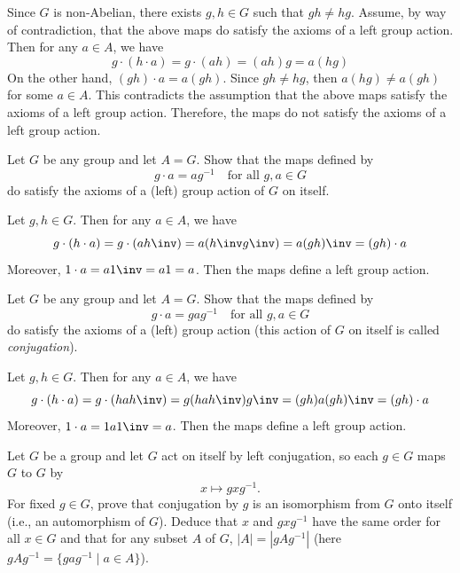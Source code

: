 \begin{sol}
    Since $G$ is non-Abelian, there exists $g, h \in G$ such that $gh \neq hg$. Assume, by way of contradiction, that the above maps do satisfy the axioms of a left group action. Then for any $a \in A$, we have
    \[g \cdot (h \cdot a) = g \cdot (ah) = (ah)g = a(hg) \]
    On the other hand, $(gh) \cdot a = a(gh)$. Since $gh \neq hg$, then $a(hg) \neq a(gh)$ for some $a \in A$. This contradicts the assumption that the above maps satisfy the axioms of a left group action. Therefore, the maps do not satisfy the axioms of a left group action.
\end{sol}

\begin{exercise}\label{ex1.7.15}
    Let $G$ be any group and let $A = G$. Show that the maps defined by  
    \[ g \cdot a = ag^{-1} \quad \text{for all } g,a\in G \]
    do satisfy the axioms of a (left) group action of $G$ on itself.
\end{exercise}

\begin{sol}
    Let $g, h \in G$. Then for any $a \in A$, we have
    \[g \cdot (h \cdot a) = g \cdot (ah\inv) = a(h\inv g\inv) = a(gh)\inv = (gh) \cdot a\]
    Moreover, $1 \cdot a = a1\inv = a1 = a$. Then the maps define a left group action.
\end{sol}

\begin{specialexercise}[Conjugation]\label{ex1.7.16}
    Let $G$ be any group and let $A = G$. Show that the maps defined by  
    \[ g \cdot a = gag^{-1} \quad \text{for all } g,a\in G \]
    do satisfy the axioms of a (left) group action (this action of $G$ on itself is called \emph{conjugation}).
\end{specialexercise}

\begin{sol}
    Let $g, h \in G$. Then for any $a \in A$, we have
    \[g \cdot (h \cdot a) = g \cdot (hah\inv) = g(hah\inv)g\inv = (gh)a(gh)\inv = (gh) \cdot a\]
    Moreover, $1 \cdot a = 1a1\inv = a$. Then the maps define a left group action.
\end{sol}

\begin{exercise} \label{ex1.7.17}
    Let $G$ be a group and let $G$ act on itself by left conjugation, so each $g\in G$ maps $G$ to $G$ by
    \[ x \mapsto gxg^{-1}. \]
    For fixed $g\in G$, prove that conjugation by $g$ is an isomorphism from $G$ onto itself (i.e., an automorphism of $G$). Deduce that $x$ and $gxg^{-1}$ have the same order for all $x\in G$ and that for any subset $A$ of $G$, $|A| = |gAg^{-1}|$ (here $gAg^{-1} = \{gag^{-1} \mid a\in A\}$).
\end{exercise}

